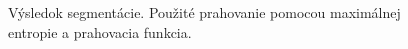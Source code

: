 \documentclass[a4paper,11pt,oneside]{article}%
\begin{document}
\begin{figure}[H]
    \hspace{5px}
    \hspace{5px}
    \caption{Výsledok segmentácie. Použité prahovanie pomocou maximálnej entropie a prahovacia funkcia.}
    \label{fig:kapur_tf}
\end{figure}
\end{document}
